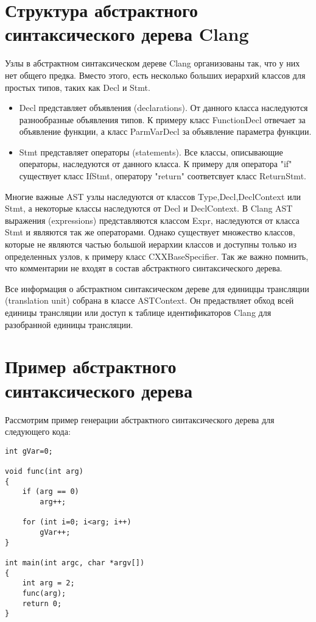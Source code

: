 \section{Структура абстрактного синтаксического дерева Clang}
Узлы в абстрактном синтаксическом дереве Clang организованы так, что у них нет общего предка.
Вместо этого, есть несколько больших иерархий классов для простых типов, таких как Decl и Stmt.
\begin{itemize}
	\item Decl представляет объявления (declarations). От данного класса наследуются разнообразные
объявления типов. К примеру класс FunctionDecl отвечает за объявление функции, а класс ParmVarDecl 
за объявление параметра функции.
	\item Stmt представляет операторы (statements). Все классы, описывающие операторы, наследуются
от данного класса. К примеру для оператора "if" существует класс IfStmt, оператору "return" 
соответсвует класс ReturnStmt. 
\end{itemize}
Многие важные AST узлы наследуются от классов Type,Decl,DeclContext или Stmt, а некоторые классы 
наследуются от Decl и DeclContext. В Clang AST выражения (expressions) представляются классом Expr,
наследуются от класса Stmt и являются так же операторами. Однако существует множество классов, 
которые не являются частью большой иерархии классов и доступны только из определенных узлов, 
к примеру класс CXXBaseSpecifier. Так же важно помнить, что комментарии не входят в состав 
абстрактного синтаксического дерева.

Все информация о абстрактном синтаксическом дереве для единиццы трансляции (translation unit)
собрана в классе ASTContext. Он предаствляет обход всей единицы трансляции или доступ к таблице
идентификаторов Clang для разобранной единицы трансляции. 

\section{Пример абстрактного синтаксического дерева}
Рассмотрим пример генерации абстрактного синтаксического дерева для следующего кода:
\begin{lstlisting}
int gVar=0;

void func(int arg)
{
	if (arg == 0)
		arg++;

	for (int i=0; i<arg; i++)
		gVar++;
}

int main(int argc, char *argv[])
{
	int arg = 2;
	func(arg);
	return 0;
}
\end{lstlisting}

